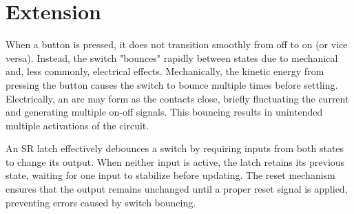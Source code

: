 \documentclass[12pt]{article}
\begin{document}
\section{Extension}

When a button is pressed, it does not transition smoothly from off to on (or vice versa). Instead, the switch "bounces" rapidly between states due to mechanical and, less commonly, electrical effects. Mechanically, the kinetic energy from pressing the button causes the switch to bounce multiple times before settling. Electrically, an arc may form as the contacts close, briefly fluctuating the current and generating multiple on-off signals. This bouncing results in unintended multiple activations of the circuit.

An SR latch effectively debounces a switch by requiring inputs from both states to change its output. When neither input is active, the latch retains its previous state, waiting for one input to stabilize before updating. The reset mechanism ensures that the output remains unchanged until a proper reset signal is applied, preventing errors caused by switch bouncing.
\end{document}

